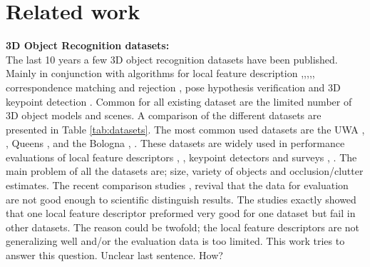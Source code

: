 \documentclass[10pt,twocolumn,letterpaper]{article}
\begin{document}
\section{Related work}\label{sec:related_work}
\textbf{3D Object Recognition datasets:}\\
The last 10 years a few 3D object recognition datasets have been published. Mainly in conjunction with algorithms for local feature description \cite{Mian2006},\cite{Taati2007},\cite{Taati2011},\cite{Tombari2010},\cite{Salti2014}, correspondence matching and rejection \cite{Rodola2013}, pose hypothesis verification \cite{Aldoma2012} and 3D keypoint detection \cite{Mian2010}. Common for all existing dataset are the limited number of 3D object models and scenes. A comparison of the different datasets are presented in Table \ref{tab:datasets}. The most common used datasets are the UWA  \cite{Mian2006}, \cite{Mian2010}, Queens \cite{Taati2007},\cite{Taati2011} and the Bologna \cite{Salti2014}, \cite{Tombari2010}. These datasets are widely used in performance evaluations of  local feature descriptors \cite{Guo2015}, \cite{Buch2016}, keypoint detectors \cite{Salti2011} and surveys \cite{Guo2014}, \cite{FilipeAlexandre2014}. The main problem of all the datasets are; size, variety of objects and occlusion/clutter estimates. The recent comparison studies \cite{Guo2015}, \cite{Buch2016} revival that the data for evaluation are not good enough to scientific distinguish results. The studies exactly showed that one local feature descriptor preformed very good for one dataset but fail in other datasets. The reason could be twofold; the local feature descriptors are not generalizing well and/or the evaluation data is too limited. This work tries to answer this question. {\color{blue} Unclear last sentence. How?}\\ 
\end{document}
